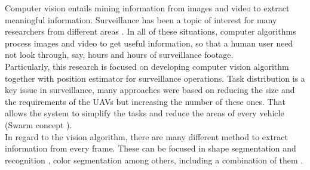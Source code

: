 Computer vision entails mining information from images and video to extract meaningful information. Surveillance has been a topic of interest for many researchers from different areas \cite{traffic_surveillance_pergamon} \cite{distributed_surveillance} \cite{vehicle_detection}. In all of these situations, computer algorithms process images and video to get useful information, so that a human user need not look through, say, hours and hours of surveillance footage. \\

Particularly, this research is focused on developing computer vision algorithm together with position estimator for surveillance operations. Task distribution \cite{Coop_Surv_aerial_JJ} \cite{Consensus_reaching_Xiao} \cite{Adaptative_tast_Meuth} \cite{distributed_architecture_Ivan_Maza}  is a key issue in surveillance, many approaches were based on reducing the size and the requirements of the UAVs but increasing the number of these ones. That allows the system to simplify the tasks and reduce the areas of every vehicle (Swarm concept \cite{SWARM_BRUXELLES} \cite{SWARM_navitagion}). \\

In regard to the vision algorithm, there are many different method to extract information from every frame. These can be focused in shape segmentation and recognition \cite{shape_using_shape_context} \cite{Vehicle_recog_markov}, color segmentation among others, including a combination of them \cite{realtime_signal_recon_shape_color} \cite{signal_recogn_shape_color} \cite{Robust_RT_tracking_color_face_Darrell}.


